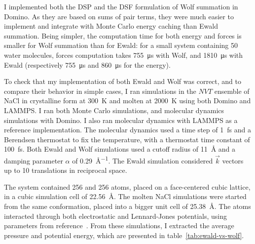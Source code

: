 \documentclass[thesis]{subfiles}
\begin{document}
I implemented both the DSP and the DSF formulation of Wolf summation in
Domino. As they are based on sums of pair terms, they were much easier to
implement and integrate with Monte Carlo energy caching than Ewald summation.
Being simpler, the computation time for both energy and forces is smaller for
Wolf summation than for Ewald: for a small system containing 50 water molecules,
forces computation takes \SI{755}{\micro s} with Wolf, and \SI{1810}{\micro s}
with Ewald (respectively \SI{755}{\micro s} and \SI{860}{\micro s} for the
energy).

To check that my implementation of both Ewald and Wolf was correct, and to
compare their behavior in simple cases, I ran simulations in the $NVT$ ensemble
of NaCl in crystalline form at \SI{300}{K} and molten at \SI{2000}{K} using both
Domino and LAMMPS. I ran both Monte Carlo simulations, and molecular dynamics
simulations with Domino. I also ran molecular dynamics with LAMMPS as a
reference implementation. The molecular dynamics used a time step of \SI{1}{fs}
and a Berendsen thermostat to fix the temperature, with a thermostat time
constant of \SI{100}{fs}. Both Ewald and Wolf simulations used a cutoff radius
of \SI{11}{\AA} and a damping parameter $\alpha$ of \SI{0.29}{\AA^{-1}}. The
Ewald simulation considered $\vec k$ vectors up to 10 translations in reciprocal
space.

The system contained 256  and 256  atoms, placed on a
face-centered cubic lattice, in a cubic simulation cell of \SI{22.56}{\AA}. The
molten NaCl simulations were started from the same conformation, placed into a
bigger unit cell of \SI{25.38}{\AA}. The atoms interacted through both
electrostatic and Lennard-Jones potentials, using parameters from
reference~\cite{Mao2012}. From these simulations, I extracted the average
pressure and potential energy, which are presented in
table~\ref{tab:ewald-vs-wolf}.
\end{document}
